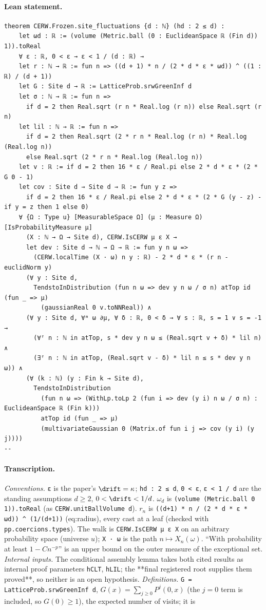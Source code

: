 \paragraph{Lean statement.}
\begin{verbatim}
theorem CERW.Frozen.site_fluctuations {d : ℕ} (hd : 2 ≤ d) :
    let ωd : ℝ := (volume (Metric.ball (0 : EuclideanSpace ℝ (Fin d)) 1)).toReal
    ∀ ε : ℝ, 0 < ε → ε < 1 / (d : ℝ) →
    let r : ℕ → ℝ := fun n => ((d + 1) * n / (2 * d * ε * ωd)) ^ ((1 : ℝ) / (d + 1))
    let G : Site d → ℝ := LatticeProb.srwGreenInf d
    let σ : ℕ → ℝ := fun n =>
      if d = 2 then Real.sqrt (r n * Real.log (r n)) else Real.sqrt (r n)
    let lil : ℕ → ℝ := fun n =>
      if d = 2 then Real.sqrt (2 * r n * Real.log (r n) * Real.log (Real.log n))
      else Real.sqrt (2 * r n * Real.log (Real.log n))
    let v : ℝ := if d = 2 then 16 * ε / Real.pi else 2 * d * ε * (2 * G 0 - 1)
    let cov : Site d → Site d → ℝ := fun y z =>
      if d = 2 then 16 * ε / Real.pi else 2 * d * ε * (2 * G (y - z) - if y = z then 1 else 0)
    ∀ {Ω : Type u} [MeasurableSpace Ω] (μ : Measure Ω) [IsProbabilityMeasure μ]
      (X : ℕ → Ω → Site d), CERW.IsCERW μ ε X →
      let dev : Site d → ℕ → Ω → ℝ := fun y n ω =>
        (CERW.localTime (X · ω) n y : ℝ) - 2 * d * ε * (r n - euclidNorm y)
      (∀ y : Site d,
        TendstoInDistribution (fun n ω => dev y n ω / σ n) atTop id (fun _ => μ)
          (gaussianReal 0 v.toNNReal)) ∧
      (∀ y : Site d, ∀ᵐ ω ∂μ, ∀ δ : ℝ, 0 < δ → ∀ s : ℝ, s = 1 ∨ s = -1 →
        (∀ᶠ n : ℕ in atTop, s * dev y n ω ≤ (Real.sqrt v + δ) * lil n) ∧
        (∃ᶠ n : ℕ in atTop, (Real.sqrt v - δ) * lil n ≤ s * dev y n ω)) ∧
      (∀ (k : ℕ) (y : Fin k → Site d),
        TendstoInDistribution
          (fun n ω => (WithLp.toLp 2 (fun i => dev (y i) n ω / σ n) : EuclideanSpace ℝ (Fin k)))
          atTop id (fun _ => μ)
          (multivariateGaussian 0 (Matrix.of fun i j => cov (y i) (y j))))
--
\end{verbatim}
\paragraph{Transcription.}
\emph{Conventions.} \verb!ε! is the paper's $\drift=\kappa$; \verb!hd : 2 ≤ d!, \verb!0 < ε!, \verb!ε < 1 / d! are the standing assumptions $d\ge2$, $0<\drift<1/d$. $\omega_d$ is \verb!(volume (Metric.ball 0 1)).toReal! (as \verb!CERW.unitBallVolume d!). $r_n$ is \verb!((d+1) * n / (2 * d * ε * ωd)) ^ (1/(d+1))! (eq:radius), every cast at a leaf (checked with \verb!pp.coercions.types!). The walk is \verb!CERW.IsCERW μ ε X! on an arbitrary probability space (universe $u$); \verb!X · ω! is the path $n\mapsto X_n(\omega)$. ``With probability at least $1-Cn^{-p}$'' is an upper bound on the outer measure of the exceptional set. \emph{Internal inputs.} The conditional assembly lemma takes both cited results as internal proof parameters \verb!hCLT!, \verb!hLIL!; the **final registered root supplies them proved**, so neither is an open hypothesis. \emph{Definitions.} \verb!G = LatticeProb.srwGreenInf d!, $G(x)=\sum_{j\ge0}P^j(0,x)$ (the $j=0$ term is included, so $G(0)\ge1$), the expected number of visits; it is
